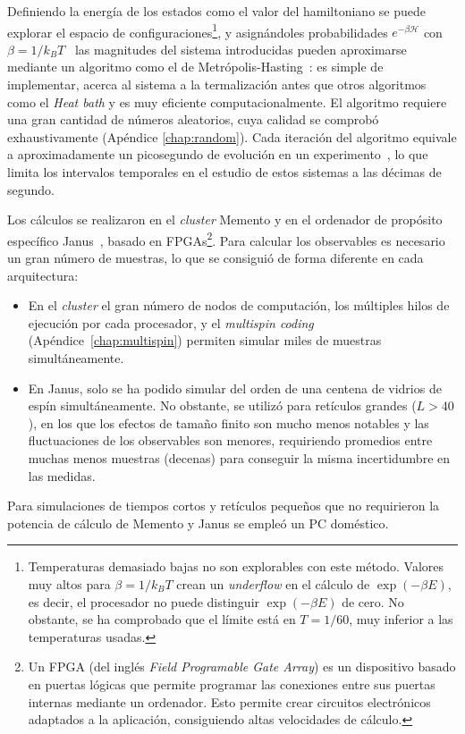 \documentclass[11pt]{report}
\newcommand{\Ham}{\mathscr{H}}
\newcommand{\sub}[1]{ _{{\scriptscriptstyle \mathit{#1}}}  }
\newcommand{\kb}{k\sub{B}}
\begin{document}
Definiendo la energía de los estados como el valor del hamiltoniano se
puede explorar el espacio de configuraciones\footnote{ Temperaturas
  demasiado bajas no son explorables con este método. Valores muy
  altos para $β=1/\kb T$ crean un \textit{underflow} en el cálculo de
  $\exp(-βE)$, es decir, el procesador no puede distinguir $\exp(-βE)$
  de cero. No obstante, se ha comprobado que el límite está en
  $T=1/60$, muy inferior a las temperaturas usadas. }, y asignándoles
probabilidades $e^{-β \Ham}$ con $β=1/\kb T$ \  las magnitudes del
sistema introducidas pueden aproximarse mediante un algoritmo como el
de Metrópolis-Hasting~\cite{metropolis}: es simple de implementar,
acerca al sistema a la termalización antes que otros algoritmos como
el \textit{Heat bath} y es muy eficiente computacionalmente. El
algoritmo requiere una gran cantidad de números aleatorios, cuya
calidad se comprobó exhaustivamente (Apéndice \ref{chap:random}). Cada
iteración del algoritmo equivale a aproximadamente un picosegundo de
evolución en un experimento~\cite{tiempos}, lo que limita los
intervalos temporales en el estudio de estos sistemas a las décimas de
segundo.

Los cálculos se realizaron en el \textit{cluster} Memento y en el
ordenador de propósito específico Janus~\cite{janus}, basado en
FPGAs\footnote{Un FPGA (del inglés \textit{Field Programable Gate
    Array}) es un dispositivo basado en puertas lógicas que permite
  programar las conexiones entre sus puertas internas mediante un
  ordenador. Esto permite crear circuitos electrónicos adaptados a la
  aplicación, consiguiendo altas velocidades de cálculo.}. Para
calcular los observables es necesario un gran número de
muestras, lo que se consiguió de forma diferente en cada arquitectura:
\begin{itemize}
\item En el \textit{cluster} el gran número de nodos de computación,
  los múltiples hilos de ejecución por cada procesador, y el
  \textit{multispin coding}~\cite{onetruemultispincoding}
  (Apéndice~\ref{chap:multispin}) permiten simular miles de muestras
  simultáneamente.
\item En Janus, solo se ha podido simular del orden de una centena de
  vidrios de espín simultáneamente. No obstante, se utilizó para retículos
  grandes ($L>40$), en los que los efectos de tamaño finito son mucho
  menos notables y las fluctuaciones de los observables son menores,
  requiriendo promedios entre muchas menos muestras (decenas) para
  conseguir la misma incertidumbre en las medidas.
\end{itemize}
Para simulaciones de tiempos cortos y retículos pequeños que no
requirieron la potencia de cálculo de Memento y Janus se empleó un PC
doméstico.
\end{document}
